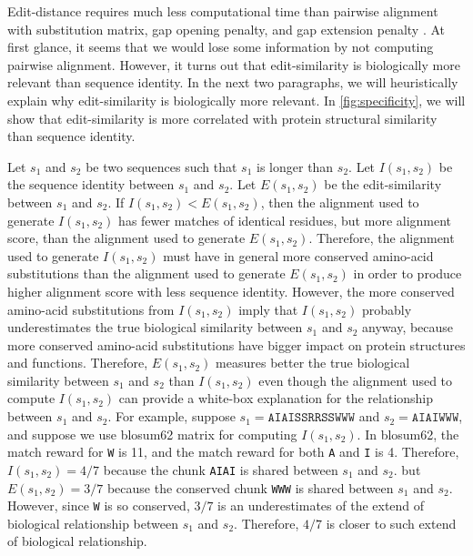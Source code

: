 \documentclass[]{article}
\begin{document}
Edit-distance requires much less computational time than pairwise alignment with substitution matrix, gap opening penalty, and gap extension penalty \cite{vsovsic2017edlib}. 
At first glance, it seems that we would lose some information by not computing pairwise alignment. 
However, it turns out that edit-similarity is biologically more relevant than sequence identity.
In the next two paragraphs, we will heuristically explain why edit-similarity is biologically more relevant.
In \ref{fig:specificity}, we will show that edit-similarity is more correlated with protein structural similarity than sequence identity.

Let \(s_1\) and \(s_2\) be two sequences such that \(s_1\) is longer than \(s_2\).
Let \(I(s_1, s_2)\) be the sequence identity between \(s_1\) and \(s_2\).
Let \(E(s_1, s_2)\) be the edit-similarity between \(s_1\) and \(s_2\).
If \(I(s_1, s_2) < E(s_1, s_2)\), then the alignment used to generate \(I(s_1, s_2)\) has fewer matches of identical residues, but more alignment score, than the alignment used to generate \(E(s_1, s_2)\).
Therefore, the alignment used to generate \(I(s_1, s_2)\) must have in general more conserved amino-acid substitutions than the alignment used to generate \(E(s_1, s_2)\) in order to produce higher alignment score with less sequence identity.
However, the more conserved amino-acid substitutions from \(I(s_1, s_2)\) imply that \(I(s_1, s_2)\) probably underestimates the true biological similarity between \(s_1\) and \(s_2\) anyway, because more conserved amino-acid substitutions have bigger impact on protein structures and functions.
Therefore, \(E(s_1, s_2)\) measures better the true biological similarity between \(s_1\) and \(s_2\) than \(I(s_1, s_2)\) even though the alignment used to compute \(I(s_1, s_2)\) can provide a white-box explanation for the relationship between \(s_1\) and \(s_2\).
For example, suppose \(s_1 = \texttt{AIAISSRRSSWWW}\) and \(s_2 = \texttt{AIAIWWW}\), 
	and suppose we use blosum62 matrix for computing \(I(s_1, s_2)\).
In blosum62, the match reward for \texttt{W} is 11, and the match reward for both \texttt{A} and \texttt{I} is 4.
Therefore, \(I(s_1, s_2) = 4/7\) because the           chunk \texttt{AIAI} is shared between \(s_1\) and \(s_2\).
       but \(E(s_1, s_2) = 3/7\) because the conserved chunk \texttt{WWW}  is shared between \(s_1\) and \(s_2\).
However, since \texttt{W} is so conserved, \(3/7\) is an underestimates of the extend of biological relationship between \(s_1\) and \(s_2\).
Therefore, \(4/7\) is closer to such extend of biological relationship.
\end{document}
